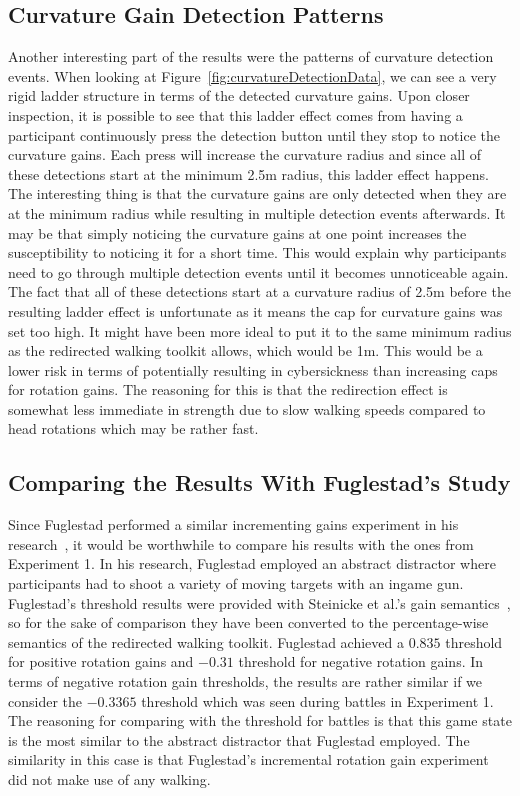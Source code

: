 \subsection{Curvature Gain Detection Patterns}
Another interesting part of the results were the patterns of curvature detection events. When looking at Figure~\ref{fig:curvatureDetectionData}, we can see a very rigid ladder structure in terms of the detected curvature gains. Upon closer inspection, it is possible to see that this ladder effect comes from having a participant continuously press the detection button until they stop to notice the curvature gains. Each press will increase the curvature radius and since all of these detections start at the minimum 2.5m radius, this ladder effect happens. The interesting thing is that the curvature gains are only detected when they are at the minimum radius while resulting in multiple detection events afterwards. It may be that simply noticing the curvature gains at one point increases the susceptibility to noticing it for a short time. This would explain why participants need to go through multiple detection events until it becomes unnoticeable again. The fact that all of these detections start at a curvature radius of 2.5m before the resulting ladder effect is unfortunate as it means the cap for curvature gains was set too high. It might have been more ideal to put it to the same minimum radius as the redirected walking toolkit allows, which would be 1m. This would be a lower risk in terms of potentially resulting in cybersickness than increasing caps for rotation gains. The reasoning for this is that the redirection effect is somewhat less immediate in strength due to slow walking speeds compared to head rotations which may be rather fast. 

\subsection{Comparing the Results With Fuglestad's Study}
Since Fuglestad performed a similar incrementing gains experiment in his research~\cite{fuglestad2018redirected}, it would be worthwhile to compare his results with the ones from Experiment 1. In his research, Fuglestad employed an abstract distractor where participants had to shoot a variety of moving targets with an ingame gun. Fuglestad's threshold results were provided with Steinicke et al.'s gain semantics~\cite{5072212}, so for the sake of comparison they have been converted to the percentage-wise semantics of the redirected walking toolkit. Fuglestad achieved a $0.835$ threshold for positive rotation gains and $-0.31$ threshold for negative rotation gains. In terms of negative rotation gain thresholds, the results are rather similar if we consider the $-0.3365$ threshold which was seen during battles in Experiment 1. The reasoning for comparing with the threshold for battles is that this game state is the most similar to the abstract distractor that Fuglestad employed. The similarity in this case is that Fuglestad's incremental rotation gain experiment did not make use of any walking. 

